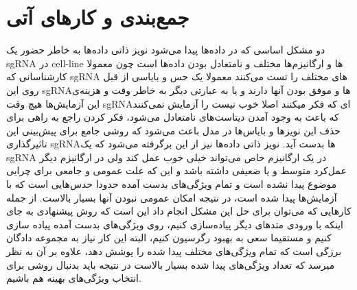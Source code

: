 \documentclass[12pt,a4paper,BCOR=.7cm,headsepline,bibliography=totoc]{report}
\begin{document}
\chapter{جمع‌بندی و کار‌های آتی}
دو مشکل اساسی که در داده‌ها پیدا می‌شود نویز ذاتی داده‌ها به خاطر حضور یک sgRNA در cell-line ها و ارگانیزم‌ها مختلف و نامتعادل بودن داده‌ها است چون معمولا کارشناسانی که sgRNA های مختلف را تست می‌کنند معمولا یک حس و بایاسی از قبل روی این sgRNAها و موفق بودن آنها دارند و یا به عبارتی دیگر به خاطر وقت و هزینه‌ی این آزمایش‌ها هیچ وقت sgRNAای که فکر میکنند اصلا خوب نیست را آزمایش نمی‌کنند که باعث به وجود آمدن دیتاست‌های نامتعادل می‌شود، فکر کردن راجع به راهی برای حذف این نویز‌ها و بایاس‌ها در مدل باعث می‌شود که روشی جامع برای پیش‌بینی این تاثیرگذاری sgRNAها بدست آید. نویز ذاتی داده‌ها نیز از این برگرفته می‌شود که یک sgRNA در یک ارگانیزم خاص می‌تواند خیلی خوب عمل کند ولی در ارگانیزم دیگر عمل‌کرد متوسط و یا ضعیفی داشته باشد و این که علت عمومی و جامعی برای چرایی موضوع پیدا نشده است و تمام ویژگی‌های بدست آمده حدودا حدس‌هایی است که با آزمایش‌ها پیدا شده است، در نتیجه امکان عمومی نبودن آنها بسیار بالاست. از جمله کار‌هایی که می‌توان برای حل این مشکل انجام داد این است که روش پیشنهادی به جای اینکه با ورودی متد‌های دیگر پیاده‌سازی کنیم، روی ویژگی‌های بدست آمده پیاده سازی کنیم و مستقیما سعی به بهبود رگرسیون کنیم، البته این کار نیاز به مجموعه دادگان برزگی است که تمام ویژگی‌های مختلف پیدا شده را پوشش دهد، علاوه بر آن به نظر میرسد که تعداد ویژگی‌های پیدا شده بسیار بالاست در نتیجه باید بدنبال روشی برای انتخاب ویژگی‌های بهینه هم باشیم.



\end{document}

